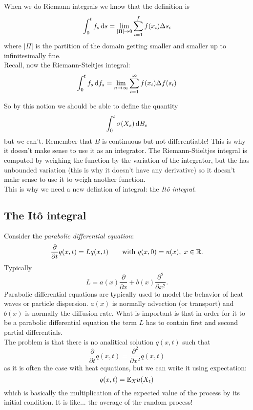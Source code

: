 \documentclass[crop=false, class=article]{standalone}
\begin{document}
\begin{revise}
	When we do Riemann integrals we know that the definition is 
	\begin{equation*}
		\int_{0}^{t}f_{s}\mathop{}\!\mathrm{d} s=\lim_{|\Pi|\to 0}\sum_{i=1}^{f}f(x_{i})\Delta s_{i}
	\end{equation*}
	where $|\Pi|$ is the partition of the domain getting smaller and smaller up to infinitesimally fine.\\
	Recall, now the Riemann-Steltjes integral:
	\begin{equation*}
		\int_{0}^{t}f_{s}\mathop{}\!\mathrm{d} f_{s}=\lim_{n\to\infty}\sum_{i=1}^{\infty}f(x_{i})\Delta f(s_{i})
	\end{equation*}
\end{revise}
	So by this notion we should be able to define the quantity
	\begin{equation*}
		\int_{0}^{t}\sigma(X_{s})\mathop{}\!\mathrm{d} B_{s}
	\end{equation*}
	but we can't. Remember that $B$ is continuous but not differentiable! This is why it doesn't make sense to use it as an integrator. The Riemann-Stieltjes integral is computed by weighing the function by the variation of the integrator, but the \brm{} has unbounded variation (this is why it doesn't have any derivative) so it doesn't make sense to use it to weigh another function. \\
	This is why we need a new defintion of integral: the \emph{It\^o integral}.
\subsection{The It\^o integral}
Consider the \textit{parabolic differential equation}:
\begin{equation*}
	\frac{\partial}{\partial t}q(x,t)=Lq(x,t)\qquad\text{with }q(x,0)=u(x),\;x\in\mathbb{R}.
\end{equation*}
Typically 
\begin{equation*}
	L=a(x)\frac{\partial}{\partial x}+b(x)\frac{\partial^{2}}{\partial x^{2}}.
\end{equation*}
Parabolic differential equations are typically used to model the behavior of heat waves or particle dispersion. $a(x)$ is normally advection (or transport) and $b(x)$ is normally the diffusion rate. What is important is that in order for it to be a parabolic differential equation the term $L$ has to contain first and second partial differentials.\\
The problem is that there is no analitical solution $q(x,t)$ such that
\begin{equation*}
	\frac{\partial}{\partial t}q(x,t)=\frac{\partial^{2}}{\partial x^{2}}q(x,t)
\end{equation*}
as it is often the case with heat equations, but we can write it using expectation:
\begin{equation*}
	q(x,t)=\mathbb{E}_{X}u(X_{t})
\end{equation*}
which is basically the multiplication of the expected value of the process by its initial condition. It is like... the average of the random process!
\end{document}
